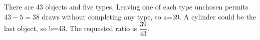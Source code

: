 There are 43 objects and five types. Leaving one of each type unchosen permits $43-5=38$ draws without completing any type, so a=39. A cylinder could be the last object, so b=43. The requested ratio is $\boxed{\dfrac{39}{43}}$.
